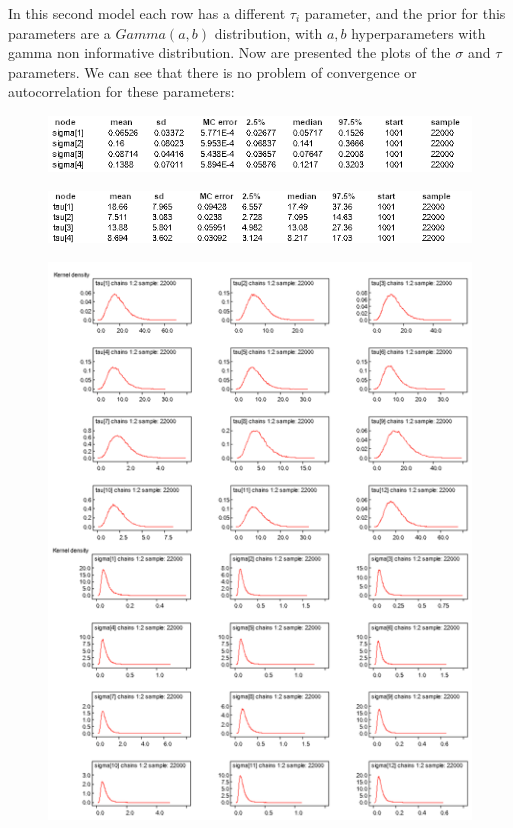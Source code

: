 \documentclass{article}
\begin{document}
In this second model each row has a different $\tau_i$ parameter, and the prior for this parameters are a $Gamma(a,b)$ distribution, with $a, b$ hyperparameters with gamma non informative distribution. Now are presented the plots of the $\sigma$ and $\tau$ parameters. We can see that there is no problem of convergence or autocorrelation for these parameters:
\begin{figure}[ht!]
\centering
\includegraphics[width=12cm]{figures/model2_ultima.png}
\end{figure}
\begin{figure}[ht!]
\centering
\includegraphics[width=12cm]{figures/model2_ultima2.png}
\end{figure}
\begin{figure}[ht!]
\centering
\includegraphics[width=12cm]{figures/model2_sigma.png}
\end{figure}
\end{document}

